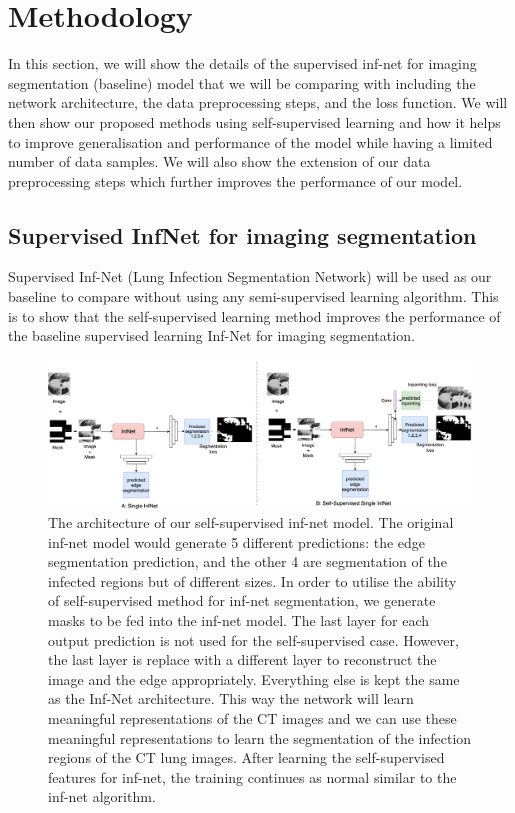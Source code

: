 \section{Methodology}


In this section, we will show the details of the supervised inf-net for imaging segmentation (baseline) model that we will be comparing with including the network architecture, the data preprocessing steps, and the loss function. We will then show our proposed methods using self-supervised learning and how it helps to improve generalisation and performance of the model while having a limited number of data samples. We will also show the extension of our data preprocessing steps which further improves the performance of our model.

\subsection{Supervised InfNet for imaging segmentation}
Supervised Inf-Net	(Lung Infection Segmentation Network) will be used as our baseline \cite{ref14} to compare without using any semi-supervised learning algorithm. This is to show that the self-supervised learning method  improves the performance of the baseline supervised learning Inf-Net for imaging segmentation. 

\begin{figure}
	\centering
	\includegraphics[width=\linewidth]{self-super-inf-net.png}
	\caption{The architecture of our self-supervised inf-net model. The original inf-net model would generate 5 different predictions: the edge segmentation prediction, and the other 4 are segmentation of the infected regions but of different sizes. In order to utilise the ability of self-supervised method for inf-net segmentation, we generate masks to be fed into the inf-net model. The last layer for each output prediction is not used for the self-supervised case. However, the last layer is replace with a different layer to reconstruct the image and the edge appropriately. Everything else is kept the same as the Inf-Net architecture. This way the network will learn meaningful representations of the CT images and we can use these meaningful representations to learn the segmentation of the infection regions of the CT lung images. After learning the self-supervised features for inf-net, the training continues as normal similar to the inf-net algorithm. }
	\label{fig:inf-net_arch}
\end{figure}

